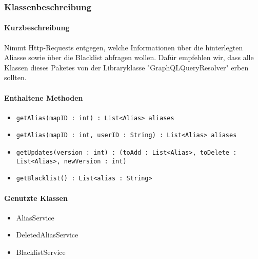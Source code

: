 \subsubsection*{Klassenbeschreibung}%
\paragraph*{Kurzbeschreibung}
Nimmt Http-Requests entgegen, welche Informationen über die hinterlegten Aliasse sowie über die Blacklist abfragen wollen.
Dafür empfehlen wir, dass alle Klassen dieses Paketes von der Libraryklasse "GraphQLQueryResolver" erben sollten.
\paragraph*{Enthaltene Methoden}
\begin{itemize}
    \item \texttt{getAlias(mapID : int) : List<Alias> aliases}
    \item \texttt{getAlias(mapID : int, userID : String) : List<Alias> aliases}
    \item \texttt{getUpdates(version : int) : (toAdd : List<Alias>, toDelete : List<Alias>, newVersion : int)}
    \item \texttt{getBlacklist() : List<alias : String>}
\end{itemize}
\paragraph*{Genutzte Klassen}
\begin{itemize}
    \item AliasService
    \item DeletedAliasService
    \item BlacklistService
\end{itemize}